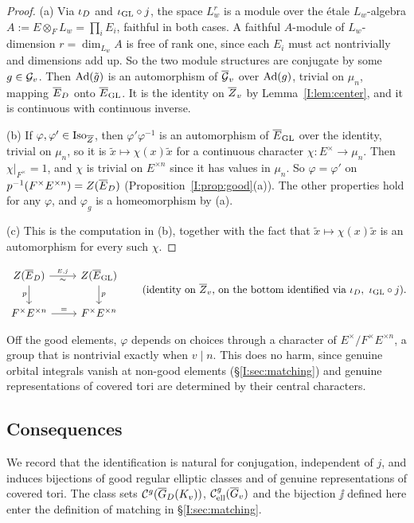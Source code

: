 \begin{proof}
(a) Via $\iota_D$ and $\iota_{\mathrm{GL}}\circ j$, the space $L_w^r$ is a module over the \'etale $L_w$-algebra $A:=E\otimes_FL_w=\prod_iE_i$, faithful in both cases. A faithful $A$-module of $L_w$-dimension $r=\dim_{L_w}A$ is free of rank one, since each $E_i$ must act nontrivially and dimensions add up. So the two module structures are conjugate by some $g\in\mathcal{G}_v$. Then $\operatorname{Ad}(\tilde g)$ is an automorphism of $\overline{\mathcal{G}}_v$ over $\operatorname{Ad}(g)$, trivial on $\mu_n$, mapping $\overline{E}_D$ onto $\overline{E}_{\mathrm{GL}}$. It is the identity on $\overline{Z}_v$ by Lemma~\ref{I:lem:center}, and it is continuous with continuous inverse.

(b) If $\varphi,\varphi'\in\operatorname{Iso}_{\overline{Z}}$, then $\varphi'\varphi^{-1}$ is an automorphism of $\overline{E}_{\mathrm{GL}}$ over the identity, trivial on $\mu_n$, so it is $\tilde x\mapsto\chi(x)\tilde x$ for a continuous character $\chi:E^\times\to\mu_n$. Then $\chi|_{F^\times}=1$, and $\chi$ is trivial on $E^{\times n}$ since it has values in $\mu_n$. So $\varphi=\varphi'$ on $p^{-1}(F^\times E^{\times n})=Z(\overline{E}_D)$ (Proposition~\ref{I:prop:good}(a)). The other properties hold for any $\varphi$, and $\varphi_g$ is a homeomorphism by (a).

(c) This is the computation in (b), together with the fact that $\tilde x\mapsto\chi(x)\tilde x$ is an automorphism for every such $\chi$.
\end{proof}

\begin{equation}\label{I:eq:toridiagram}
\begin{tikzcd}
Z(\Eb_D)\arrow[r,"\jj_{E,j}","\sim"']\arrow[d,"p"'] & Z(\Eb_{\GL})\arrow[d,"p"]\\
F^\times E^{\times n}\arrow[r,"="] & F^\times E^{\times n}
\end{tikzcd}
\qquad\text{(identity on }\Zb_v\text{, on the bottom identified via }\iD,\ \iG\circ j).
\end{equation}

\begin{remark}
Off the good elements, $\varphi$ depends on choices through a character of $E^\times/F^\times E^{\times n}$, a group that is nontrivial exactly when $v\mid n$. This does no harm, since genuine orbital integrals vanish at non-good elements (\S\ref{I:sec:matching}) and genuine representations of covered tori are determined by their central characters.
\end{remark}

\subsection{Consequences}\label{I:subsec:cons}
We record that the identification is natural for conjugation, independent of $j$, and induces bijections of good regular elliptic classes and of genuine representations of covered tori. The class sets $\mathcal C^{g}(\overline{G}_D(K_v))$, $\mathcal C^{g}_{\mathrm{ell}}(\overline{G}_v)$ and the bijection $\jj$ defined here enter the definition of matching in \S\ref{I:sec:matching}.

